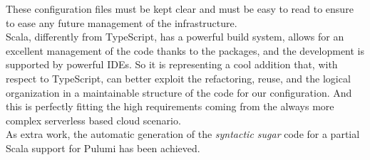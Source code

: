 These configuration files must be kept clear and must be easy to read to ensure to ease any future management of the infrastructure.\\
Scala, differently from TypeScript, has a powerful build system, allows for an excellent management of the code thanks to the packages, and the development is supported by powerful IDEs.
So it is representing a cool addition that, with respect to TypeScript, can better exploit the refactoring, reuse, and the logical organization in a maintainable structure of the code for our configuration.
And this is perfectly fitting the high requirements coming from the always more complex serverless based cloud scenario.\\
As extra work, the automatic generation of the \textit{syntactic sugar} code for a partial Scala support for Pulumi has been achieved.








